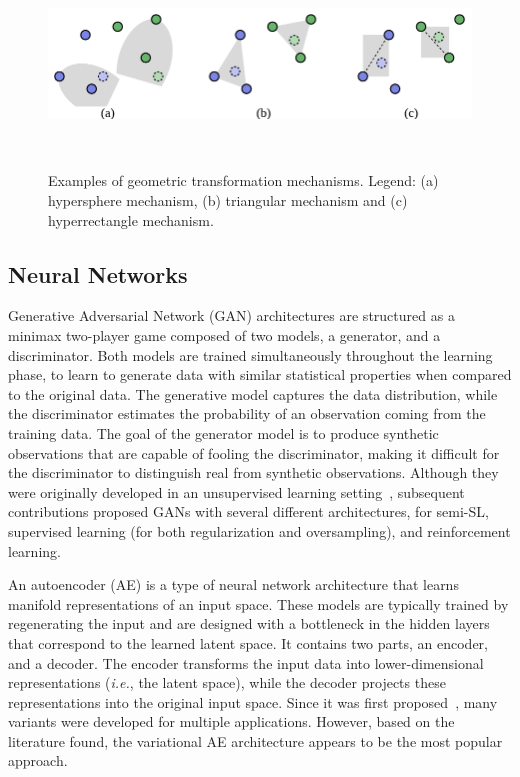 \begin{figure}
	\centering
	\includegraphics[width=.7\linewidth]{../analysis/geometric-transformations}
    \caption{%
        Examples of geometric transformation mechanisms. Legend: (a)
        hypersphere mechanism, (b) triangular mechanism and (c)
        hyperrectangle mechanism.
    }~\label{fig:geometric-transformations}
\end{figure}

\subsection{Neural Networks}

Generative Adversarial Network (GAN) architectures are structured as a minimax
two-player game composed of two models, a generator, and a discriminator. Both
models are trained simultaneously throughout the learning phase, to learn to
generate data with similar statistical properties when compared to the
original data. The generative model captures the data distribution, while the
discriminator estimates the probability of an observation coming from the
training data. The goal of the generator model is to produce synthetic
observations that are capable of fooling the discriminator, making it
difficult for the discriminator to distinguish real from synthetic
observations. Although they were originally developed in an unsupervised
learning setting~\cite{goodfellow2020generative}, subsequent contributions
proposed GANs with several different architectures, for semi-SL, supervised
learning (for both regularization and oversampling), and reinforcement
learning.

An autoencoder (AE) is a type of neural network architecture that learns
manifold representations of an input space. These models are typically trained
by regenerating the input and are designed with a bottleneck in the hidden
layers that correspond to the learned latent space. It contains two parts,
an encoder, and a decoder. The encoder transforms the input data into
lower-dimensional representations (\textit{i.e.}, the latent space), while
the decoder projects these representations into the original input space.
Since it was first proposed~\cite{ackley1985learning}, many variants were
developed for multiple applications. However, based on the literature found,
the variational AE architecture appears to be the most popular approach.

